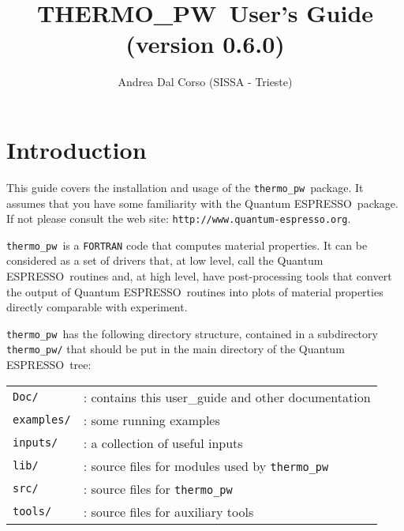 \documentclass[12pt,a4paper]{article}
\def\version{0.6.0}
\def\qe{{\sc Quantum ESPRESSO}}
\def\tpw{{\sc THERMO\_PW}}
\def\thermo{\texttt{thermo\_pw}}
\begin{document}
 
\author{Andrea Dal Corso (SISSA - Trieste)}
\date{}


\title{
  \vskip 1cm
  {\color{red} \Huge \tpw\ User's Guide} \\
  \Large (version \version)
}

\maketitle

\tableofcontents

\newpage

\section{\color{coral}Introduction}

This guide covers the installation and usage of the \thermo\ package. 
It assumes that you have some familiarity with the \qe\ package. 
If not please consult the web site: \texttt{http://www.quantum-espresso.org}.

\thermo\ is a \texttt{FORTRAN} code that computes material properties.
It can be considered as a set of drivers that,
at low level, call the \qe\ routines and, at high level, have post-processing 
tools that convert the output of \qe\ routines into plots of material 
properties directly comparable with experiment.

\thermo\ has the following directory structure, contained in a subdirectory 
\texttt{thermo\_pw/} that should be put in the main directory of the \qe\ tree:

\begin{tabular}{ll}
\texttt{Doc/}      & : contains this user\_guide and other documentation\\
\texttt{examples/} & : some running examples \\
\texttt{inputs/}   & : a collection of useful inputs \\
\texttt{lib/}      & : source files for modules used by \thermo\ \\
\texttt{src/}      & : source files for \thermo\ \\
\texttt{tools/}    & : source files for auxiliary tools \\
\end{tabular}\\
\end{document}
